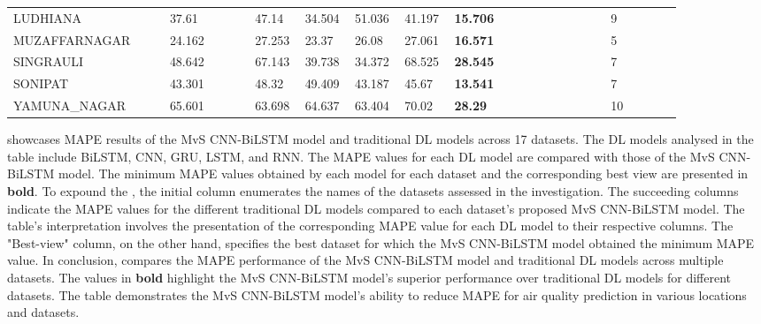\begin{landscape}
{\begin{longtable}[h!]{ p{0.22\linewidth} p{0.12\linewidth} p{0.07\linewidth} p{0.07\linewidth}  p{0.07\linewidth} p{0.07\linewidth} p{0.22\linewidth}  p{0.1\linewidth}}
    LUDHIANA       & 37.61        & 47.14     & 34.504    & 51.036     & 41.197    & \textbf{15.706} & 9      \\
    MUZAFFARNAGAR  & 24.162       & 27.253    & 23.37     & 26.08      & 27.061    & \textbf{16.571} & 5      \\
    SINGRAULI      & 48.642       & 67.143    & 39.738    & 34.372     & 68.525    & \textbf{28.545} & 7      \\
    SONIPAT        & 43.301       & 48.32     & 49.409    & 43.187     & 45.67     & \textbf{13.541} & 7      \\
    YAMUNA\_NAGAR  & 65.601       & 63.698    & 64.637    & 63.404     & 70.02     & \textbf{28.29}  & 10    \\ \hline
    \end{longtable}}
    \end{landscape}

 showcases MAPE results of the MvS CNN-BiLSTM model and traditional DL models across 17 datasets. The DL models analysed in the table include BiLSTM,  CNN,  GRU,  LSTM,  and RNN. The MAPE values for each DL model are compared with those of the MvS CNN-BiLSTM model. The minimum MAPE values obtained by each model for each dataset and the corresponding best view are presented in \textbf{bold}. To expound the ,  the initial column enumerates the names of the datasets assessed in the investigation. The succeeding columns indicate the MAPE values for the different traditional DL models compared to each dataset's proposed MvS CNN-BiLSTM model. The table's interpretation involves the presentation of the corresponding MAPE value for each DL model to their respective columns. The "Best-view" column,  on the other hand,  specifies the best dataset for which the MvS CNN-BiLSTM model obtained the minimum MAPE value. In conclusion,   compares the MAPE performance of the MvS CNN-BiLSTM model and traditional DL models across multiple datasets. The values in \textbf{bold} highlight the MvS CNN-BiLSTM model's superior performance over traditional DL models for different datasets. The table demonstrates the MvS CNN-BiLSTM model's ability to reduce MAPE for air quality prediction in various locations and datasets.



